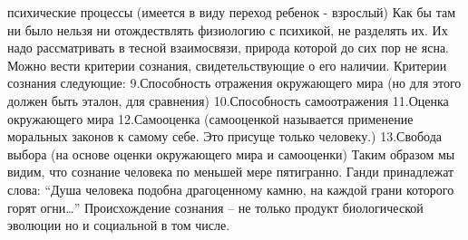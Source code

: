 \documentclass[12pt]{article}
\begin{document}
психические процессы (имеется в виду переход ребенок - взрослый)
Как бы там ни было нельзя ни отождествлять физиологию с психикой, не разделять их. Их надо рассматривать в
тесной взаимосвязи, природа которой до сих пор не ясна.
Можно вести критерии сознания, свидетельствующие о его наличии. Критерии сознания следующие:
9.Способность отражения окружающего мира (но для этого должен быть эталон, для сравнения)
10.Способность самоотражения
11.Оценка окружающего мира 
12.Самооценка (самооценкой называется применение моральных законов к самому себе. Это присуще только
человеку.)
13.Свобода выбора (на основе оценки окружающего мира и самооценки)
Таким образом мы видим, что сознание человека по меньшей мере пятигранно. Ганди принадлежат слова:
“Душа человека подобна драгоценному камню, на каждой грани которого горят огни…”
Происхождение сознания – не только продукт биологической эволюции но и социальной в том числе.

\newpage
\end{document}
